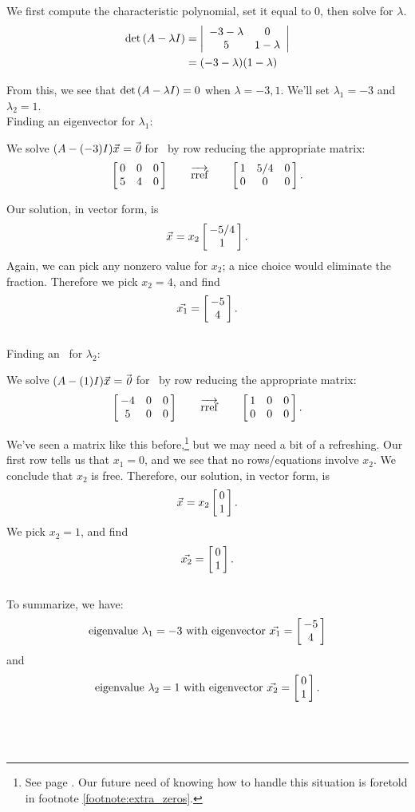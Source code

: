 {We first compute the characteristic polynomial, set it equal to 0, then solve for $\lambda$.
\begin{align*}
\det{\tta-\lambda\tti} 	&= 	\bdt{cc} -3-\lambda & 0\\5&1-\lambda \edt \\
												&= 	(-3-\lambda)(1-\lambda)
\end{align*}

From this, we see that $\det{\tta-\lambda\tti}=0$ when $\lambda = -3, 1$. We'll set $\lambda_1 = -3$ and $\lambda_2 = 1$.\\

Finding an eigenvector for $\lambda_1$:

We solve $(\tta-(-3)\tti)\vx =\zero$ for \vx\ by row reducing the appropriate matrix:
$$\bmx{ccc} 0 & 0 &0 \\ 5 & 4 & 0 \emx \quad\quad\overrightarrow{\text{rref}}\quad\quad \bmx{ccc}1&5/4&0\\0&0&0\emx.$$

Our solution, in vector form, is
$$\vx = x_2\bmx{c}-5/4\\1\emx.$$ Again, we can pick any nonzero value for $x_2$; a nice choice would eliminate the fraction. Therefore we pick $x_2 = 4$, and find $$\vx[1] = \bmx{c} -5\\4\emx.$$\\

Finding an \ev\ for $\lambda_2$:

We solve $(\tta-(1)\tti)\vx =\zero$ for \vx\ by row reducing the appropriate matrix:
$$\bmx{ccc} -4 & 0 &0 \\ 5 & 0 & 0 \emx \quad\quad\overrightarrow{\text{rref}}\quad\quad \bmx{ccc}1&0&0\\0&0&0\emx.$$

We've seen a matrix like this before,\footnote{See page \pageref{footnote:extra_zeros}. Our future need of knowing how to handle this situation is foretold in footnote \ref{footnote:extra_zeros}.} but we may need a bit of a refreshing. Our first row tells us that $x_1 = 0$, and we see that no rows/equations involve $x_2$. We conclude that $x_2$ is free.   Therefore, our solution, in vector form, is
$$\vx = x_2\bmx{c}0\\1\emx.$$ We pick $x_2 = 1$, and find $$\vx[2] = \bmx{c} 0\\1\emx.$$\\

To summarize, we have: $$\text{eigenvalue } \lambda_1 = -3 \text{ with  \ev\ } \vx[1] = \bmx{c}-5\\4\emx$$ and $$\text{\el\ } \lambda_2 = 1 \text{ with \ev\ } \vx[2] = \bmx{c}0\\1\emx.$$
\ } \\ %


